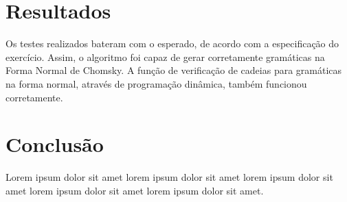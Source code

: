 \documentclass[journal,transmag]{IEEEtran}
\begin{document}
\section{Resultados}
Os testes realizados bateram com o esperado, de acordo com a especificação do 
exercício. Assim, o algoritmo foi capaz de gerar corretamente gramáticas na
Forma Normal de Chomsky. A função de verificação de cadeias para gramáticas na
forma normal, através de programação dinâmica, também funcionou corretamente.

\section{Conclusão}
Lorem ipsum dolor sit amet lorem ipsum dolor sit amet lorem ipsum dolor sit amet
lorem ipsum dolor sit amet lorem ipsum dolor sit amet.


%
%

\end{document}
